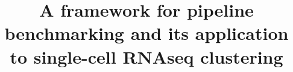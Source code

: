 \documentclass{bmcart}
\begin{document}
\begin{frontmatter}

\begin{fmbox}


\title{A framework for pipeline benchmarking and its application to single-cell RNAseq clustering}


\author[
   addressref={aff1,aff2},          %
   email={pierre-luc.germain@hest.ethz.ch}   %
]{ }
\author[
   addressref={aff1},
    email={anthony.sonrel@uzh.ch}
]{ }
\author[
   addressref={aff1},
   corref={aff1},  %
   email={mark.robinson@imls.uzh.ch}
]{ }


\address[id=aff1]{
  , %
  ,
  ,
}
\address[id=aff2]{
  ,
  ,
  ,
}


\end{fmbox}
\end{frontmatter}
\end{document}
